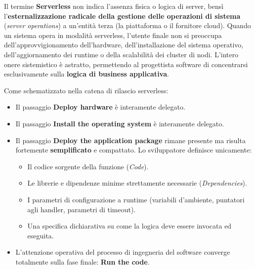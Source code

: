 \documentclass[11pt, a4paper]{article}
\begin{document}
Il termine \textbf{Serverless} non indica l'assenza fisica o logica di server, bensì l'\textbf{esternalizzazione radicale della gestione delle operazioni di sistema} (\emph{server operations}) a un'entità terza (la piattaforma o il fornitore cloud). Quando un sistema opera in modalità serverless, l'utente finale non si preoccupa dell'approvvigionamento dell'hardware, dell'installazione del sistema operativo, dell'aggiornamento dei runtime o della scalabilità dei cluster di nodi. L'intero onere sistemistico è astratto, permettendo al progettista software di concentrarsi esclusivamente sulla \textbf{logica di business applicativa}.


Come schematizzato nella catena di rilascio serverless:
\begin{itemize}[noitemsep]
    \item Il passaggio \textbf{Deploy hardware} è interamente delegato.
    \item Il passaggio \textbf{Install the operating system} è interamente delegato.
    \item Il passaggio \textbf{Deploy the application package} rimane presente ma risulta fortemente \textbf{semplificato} e compattato. Lo sviluppatore definisce unicamente:
    \begin{itemize}[noitemsep]
        \item Il codice sorgente della funzione (\emph{Code}).
        \item Le librerie e dipendenze minime strettamente necessarie (\emph{Dependencies}).
        \item I parametri di configurazione a runtime (variabili d'ambiente, puntatori agli handler, parametri di timeout).
        \item Una specifica dichiarativa su come la logica deve essere invocata ed eseguita.
    \end{itemize}
    \item L'attenzione operativa del processo di ingegneria del software converge totalmente sulla fase finale: \textbf{Run the code}.
\end{itemize}
\end{document}
